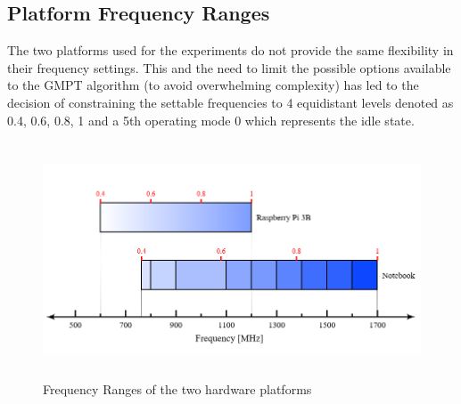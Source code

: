 \subsection{Platform Frequency Ranges}
The two platforms used for the experiments do not provide the same flexibility in their frequency settings. This and the need to limit the possible options available to the GMPT algorithm (to avoid overwhelming complexity) has led to the decision of constraining the settable frequencies to 4 equidistant levels denoted as 0.4, 0.6, 0.8, 1 and a 5th operating mode 0 which represents the idle state.\\
\begin{figure}[H]
  \centering
  \includegraphics[height=7cm]{figures/freq_ranges}
  \caption[Frequency Ranges]{Frequency Ranges of the two hardware platforms}\label{fig:i_frq}
\end{figure}

